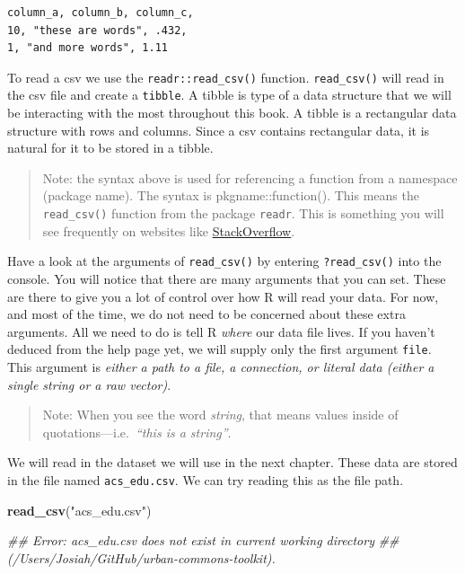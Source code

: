 \documentclass[
]{book}
\newenvironment{Shaded}{\begin{snugshade}}{\end{snugshade}}
\newcommand{\CommentTok}[1]{\textcolor[rgb]{0.56,0.35,0.01}{\textit{#1}}}
\newcommand{\KeywordTok}[1]{\textcolor[rgb]{0.13,0.29,0.53}{\textbf{#1}}}
\newcommand{\NormalTok}[1]{#1}
\newcommand{\StringTok}[1]{\textcolor[rgb]{0.31,0.60,0.02}{#1}}
\begin{document}
\begin{verbatim}
column_a, column_b, column_c,
10, "these are words", .432,
1, "and more words", 1.11
\end{verbatim}

To read a csv we use the \texttt{readr::read\_csv()} function. \texttt{read\_csv()} will read in the csv file and create a \texttt{tibble}. A tibble is type of a data structure that we will be interacting with the most throughout this book. A tibble is a rectangular data structure with rows and columns. Since a csv contains rectangular data, it is natural for it to be stored in a tibble.

\begin{quote}
Note: the syntax above is used for referencing a function from a namespace (package name). The syntax is pkgname::function(). This means the \texttt{read\_csv()} function from the package \texttt{readr}. This is something you will see frequently on websites like \href{https://stackoverflow.com/questions/tagged/r}{StackOverflow}.
\end{quote}

Have a look at the arguments of \texttt{read\_csv()} by entering \texttt{?read\_csv()} into the console. You will notice that there are many arguments that you can set. These are there to give you a lot of control over how R will read your data. For now, and most of the time, we do not need to be concerned about these extra arguments. All we need to do is tell R \emph{where} our data file lives. If you haven't deduced from the help page yet, we will supply only the first argument \texttt{file}. This argument is \emph{either a path to a file, a connection, or literal data (either a single string or a raw vector)}.

\begin{quote}
Note: When you see the word \emph{string}, that means values inside of quotations---i.e.~\emph{``this is a string''}.
\end{quote}

We will read in the dataset we will use in the next chapter. These data are stored in the file named \texttt{acs\_edu.csv}. We can try reading this as the file path.

\begin{Shaded}
\begin{Highlighting}[]
\KeywordTok{read\_csv}\NormalTok{(}\StringTok{"acs\_edu.csv"}\NormalTok{)}

\CommentTok{\#\# Error: \textquotesingle{}acs\_edu.csv\textquotesingle{} does not exist in current working directory }
\CommentTok{\#\#   (\textquotesingle{}/Users/Josiah/GitHub/urban{-}commons{-}toolkit\textquotesingle{}).}
\end{Highlighting}
\end{Shaded}
\end{document}
